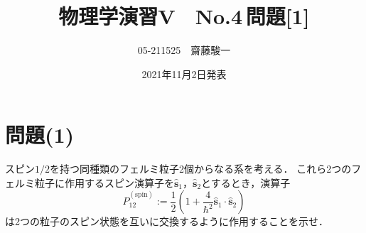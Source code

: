 \documentclass[a4paper,11pt]{jsarticle}
\begin{document}
\title{物理学演習V　No.4\,問題[1]}
\author{05-211525　齋藤駿一}
\date{2021年11月2日発表}
\maketitle

\section{問題(1)}
\begin{tcolorbox}[title=問題(1)]
  スピン$1/2$を持つ同種類のフェルミ粒子2個からなる系を考える．
  これら2つのフェルミ粒子に作用するスピン演算子を$\hat{\bm{s}}_1$，$\hat{\bm{s}}_2$とするとき，演算子
  \begin{equation}
    \hat{P}^{(\mathrm{spin})}_{12} := \frac{1}{2}\left(1 + \frac{4}{\hbar^2} \hat{\bm{s}}_1\cdot \hat{\bm{s}}_2\right)
  \end{equation}
  は2つの粒子のスピン状態を互いに交換するように作用することを示せ．  
\end{tcolorbox}
\end{document}
